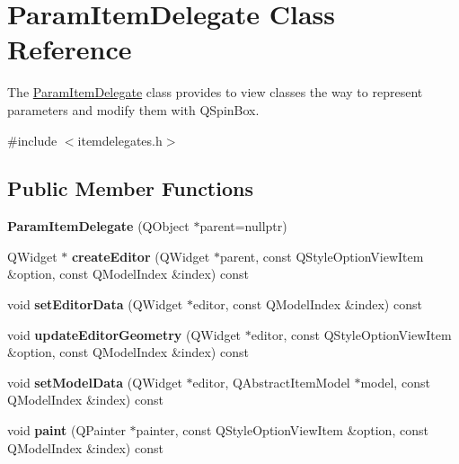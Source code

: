 \hypertarget{class_param_item_delegate}{\section{\-Param\-Item\-Delegate \-Class \-Reference}
\label{class_param_item_delegate}
}


\-The \hyperlink{class_param_item_delegate}{\-Param\-Item\-Delegate} class provides to view classes the way to represent parameters and modify them with \-Q\-Spin\-Box.  




{\ttfamily \#include $<$itemdelegates.\-h$>$}

\subsection*{\-Public \-Member \-Functions}
\begin{DoxyCompactItemize}
\item 
\hypertarget{class_param_item_delegate_a6acb9a6811ec974fc85697e56ceaec41}{{\bfseries \-Param\-Item\-Delegate} (\-Q\-Object $\ast$parent=nullptr)}\label{class_param_item_delegate_a6acb9a6811ec974fc85697e56ceaec41}

\item 
\hypertarget{class_param_item_delegate_a68e901c9ac85ccc1cbaca2b64fe69f10}{\-Q\-Widget $\ast$ {\bfseries create\-Editor} (\-Q\-Widget $\ast$parent, const \-Q\-Style\-Option\-View\-Item \&option, const \-Q\-Model\-Index \&index) const }\label{class_param_item_delegate_a68e901c9ac85ccc1cbaca2b64fe69f10}

\item 
\hypertarget{class_param_item_delegate_a798243552904b05a3cfbb466ed787ee0}{void {\bfseries set\-Editor\-Data} (\-Q\-Widget $\ast$editor, const \-Q\-Model\-Index \&index) const }\label{class_param_item_delegate_a798243552904b05a3cfbb466ed787ee0}

\item 
\hypertarget{class_param_item_delegate_a242c364371adb8f5bc44feeb6aced31f}{void {\bfseries update\-Editor\-Geometry} (\-Q\-Widget $\ast$editor, const \-Q\-Style\-Option\-View\-Item \&option, const \-Q\-Model\-Index \&index) const }\label{class_param_item_delegate_a242c364371adb8f5bc44feeb6aced31f}

\item 
\hypertarget{class_param_item_delegate_aab30c96a59e7166c2039626745aebefa}{void {\bfseries set\-Model\-Data} (\-Q\-Widget $\ast$editor, \-Q\-Abstract\-Item\-Model $\ast$model, const \-Q\-Model\-Index \&index) const }\label{class_param_item_delegate_aab30c96a59e7166c2039626745aebefa}

\item 
\hypertarget{class_param_item_delegate_a75bcc9149ab30a12101461cccaf043c4}{void {\bfseries paint} (\-Q\-Painter $\ast$painter, const \-Q\-Style\-Option\-View\-Item \&option, const \-Q\-Model\-Index \&index) const }\label{class_param_item_delegate_a75bcc9149ab30a12101461cccaf043c4}

\end{DoxyCompactItemize}


